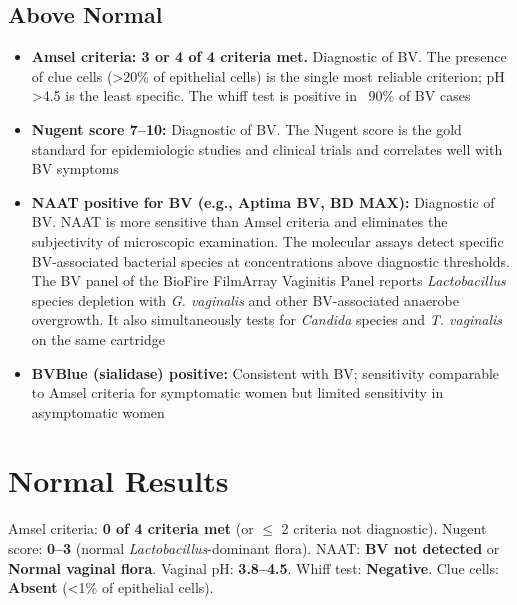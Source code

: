 \subsection*{Above Normal}
\begin{itemize}
  \item \textbf{Amsel criteria: 3 or 4 of 4 criteria met.} Diagnostic of BV. The presence of clue cells (>20\% of epithelial cells) is the single most reliable criterion; pH >4.5 is the least specific. The whiff test is positive in ~90\% of BV cases
  \item \textbf{Nugent score 7--10:} Diagnostic of BV. The Nugent score is the gold standard for epidemiologic studies and clinical trials and correlates well with BV symptoms
  \item \textbf{NAAT positive for BV (e.g., Aptima BV, BD MAX):} Diagnostic of BV. NAAT is more sensitive than Amsel criteria and eliminates the subjectivity of microscopic examination. The molecular assays detect specific BV-associated bacterial species at concentrations above diagnostic thresholds. The BV panel of the BioFire FilmArray Vaginitis Panel reports \textit{Lactobacillus} species depletion with \textit{G. vaginalis} and other BV-associated anaerobe overgrowth. It also simultaneously tests for \textit{Candida} species and \textit{T. vaginalis} on the same cartridge
  \item \textbf{BVBlue (sialidase) positive:} Consistent with BV; sensitivity comparable to Amsel criteria for symptomatic women but limited sensitivity in asymptomatic women
\end{itemize}

\section*{Normal Results}
Amsel criteria: \textbf{0 of 4 criteria met} (or $\leq$ 2 criteria not diagnostic). Nugent score: \textbf{0--3} (normal \textit{Lactobacillus}-dominant flora). NAAT: \textbf{BV not detected} or \textbf{Normal vaginal flora}. Vaginal pH: \textbf{3.8--4.5}. Whiff test: \textbf{Negative}. Clue cells: \textbf{Absent} (<1\% of epithelial cells).


